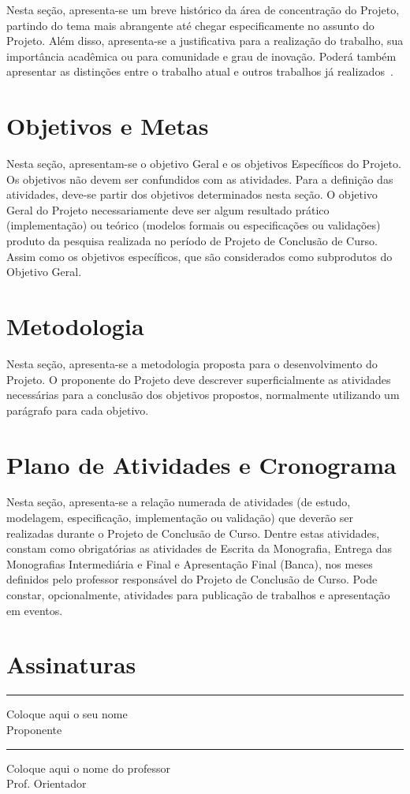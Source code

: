 \documentclass[tcc-proposta]{texsenac}
\begin{document}
Nesta seção, apresenta-se um breve histórico da área de concentração
do Projeto, partindo do tema mais abrangente até chegar
especificamente no assunto do Projeto. Além disso, apresenta-se a
justificativa para a realização do trabalho, sua importância acadêmica
ou para comunidade e grau de inovação. Poderá também apresentar as
distinções entre o trabalho atual e outros trabalhos já
realizados~\cite{vonNeumann:1966:TSR}.

\chapter{Objetivos e Metas}
Nesta seção, apresentam-se o objetivo Geral e os objetivos Específicos
do Projeto. Os objetivos não devem ser confundidos com as
atividades. Para a definição das atividades, deve-se partir dos
objetivos determinados nesta seção. O objetivo Geral do Projeto
necessariamente deve ser algum resultado prático (implementação) ou
teórico (modelos formais ou especificações ou validações) produto da
pesquisa realizada no período de Projeto de Conclusão de Curso. Assim
como os objetivos específicos, que são considerados como subprodutos
do Objetivo Geral.

\chapter{Metodologia}
Nesta seção, apresenta-se a metodologia proposta para o
desenvolvimento do Projeto. O proponente do Projeto deve descrever
superficialmente as atividades necessárias para a conclusão dos
objetivos propostos, normalmente utilizando um parágrafo para cada
objetivo.

\chapter{Plano de Atividades e Cronograma}

Nesta seção, apresenta-se a relação numerada de atividades (de estudo,
modelagem, especificação, implementação ou validação) que deverão ser
realizadas durante o Projeto de Conclusão de Curso. Dentre estas
atividades, constam como obrigatórias as atividades de Escrita da
Monografia, Entrega das Monografias Intermediária e Final e
Apresentação Final (Banca), nos meses definidos pelo professor
responsável do Projeto de Conclusão de Curso. Pode constar,
opcionalmente, atividades para publicação de trabalhos e apresentação
em eventos.




\chapter{Assinaturas}
\vspace{2cm}

\begin{center}
\rule{8cm}{.3mm}
\medskip

	Coloque aqui o seu nome\\
	Proponente

\end{center}

\vspace{4cm}

\begin{center}
\rule{8cm}{.3mm}
\medskip

	Coloque aqui o nome do professor\\
	Prof. Orientador

\end{center}
\end{document}
